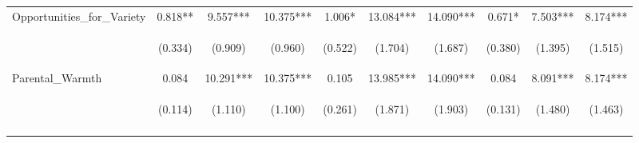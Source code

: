\begin{tabular}{lccccccccc}
\noalign{\smallskip}Opportunities_for_Variety & 0.818** & 9.557*** & 10.375*** & 1.006* & 13.084*** & 14.090*** & 0.671* & 7.503*** & 8.174***\\
 & \begin{footnotesize}(0.334)\end{footnotesize} & \begin{footnotesize}(0.909)\end{footnotesize} & \begin{footnotesize}(0.960)\end{footnotesize} & \begin{footnotesize}(0.522)\end{footnotesize} & \begin{footnotesize}(1.704)\end{footnotesize} & \begin{footnotesize}(1.687)\end{footnotesize} & \begin{footnotesize}(0.380)\end{footnotesize} & \begin{footnotesize}(1.395)\end{footnotesize} & \begin{footnotesize}(1.515)\end{footnotesize}\\
\noalign{\smallskip}Parental_Warmth & 0.084 & 10.291*** & 10.375*** & 0.105 & 13.985*** & 14.090*** & 0.084 & 8.091*** & 8.174***\\
 & \begin{footnotesize}(0.114)\end{footnotesize} & \begin{footnotesize}(1.110)\end{footnotesize} & \begin{footnotesize}(1.100)\end{footnotesize} & \begin{footnotesize}(0.261)\end{footnotesize} & \begin{footnotesize}(1.871)\end{footnotesize} & \begin{footnotesize}(1.903)\end{footnotesize} & \begin{footnotesize}(0.131)\end{footnotesize} & \begin{footnotesize}(1.480)\end{footnotesize} & \begin{footnotesize}(1.463)\end{footnotesize}\\
\noalign{\smallskip}\hline\end{tabular}\\
